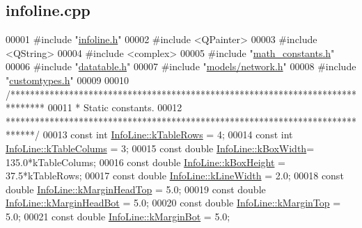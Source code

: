 \hypertarget{infoline_8cpp_source}{}\subsection{infoline.\+cpp}
\label{infoline_8cpp_source}

\begin{DoxyCode}
00001 \textcolor{preprocessor}{#include "\hyperlink{infoline_8h}{infoline.h}"}
00002 \textcolor{preprocessor}{#include <QPainter>}
00003 \textcolor{preprocessor}{#include <QString>}
00004 \textcolor{preprocessor}{#include <complex>}
00005 \textcolor{preprocessor}{#include "\hyperlink{math__constants_8h}{math\_constants.h}"}
00006 \textcolor{preprocessor}{#include "\hyperlink{datatable_8h}{datatable.h}"}
00007 \textcolor{preprocessor}{#include "\hyperlink{network_8h}{models/network.h}"}
00008 \textcolor{preprocessor}{#include "\hyperlink{customtypes_8h}{customtypes.h}"}
00009 
00010 \textcolor{comment}{/*******************************************************************************}
00011 \textcolor{comment}{ * Static constants.}
00012 \textcolor{comment}{ ******************************************************************************/}
00013 \textcolor{keyword}{const} \textcolor{keywordtype}{int} \hyperlink{class_info_line_a95cdc7a95cde6db7c6faceda995d26b9}{InfoLine::kTableRows}  = 4;
00014 \textcolor{keyword}{const} \textcolor{keywordtype}{int} \hyperlink{class_info_line_a9fc071b08eb913cf3afc623835ad2fd8}{InfoLine::kTableColums} = 3;
00015 \textcolor{keyword}{const} \textcolor{keywordtype}{double} \hyperlink{class_info_line_a33821aa140dc03829357d4006e9c153c}{InfoLine::kBoxWidth}= 135.0*kTableColums;
00016 \textcolor{keyword}{const} \textcolor{keywordtype}{double} \hyperlink{class_info_line_a9e459549795bab79ae3b6c184dc78a00}{InfoLine::kBoxHeight} = 37.5*kTableRows;
00017 \textcolor{keyword}{const} \textcolor{keywordtype}{double} \hyperlink{class_info_line_ad072bc8ef178113c36c3d480c7d637ac}{InfoLine::kLineWidth} = 2.0;
00018 \textcolor{keyword}{const} \textcolor{keywordtype}{double} \hyperlink{class_info_line_a73e02db68396f0c4b66d0cf80bd37c83}{InfoLine::kMarginHeadTop} = 5.0;
00019 \textcolor{keyword}{const} \textcolor{keywordtype}{double} \hyperlink{class_info_line_a82ed1944ec4a41af19e377a243c2332d}{InfoLine::kMarginHeadBot} = 5.0;
00020 \textcolor{keyword}{const} \textcolor{keywordtype}{double} \hyperlink{class_info_line_a995100424420038664880195f5e51f50}{InfoLine::kMarginTop} = 5.0;
00021 \textcolor{keyword}{const} \textcolor{keywordtype}{double} \hyperlink{class_info_line_ab4bd85105aabcb9d1230225c15873da2}{InfoLine::kMarginBot} = 5.0;

\end{DoxyCode}
